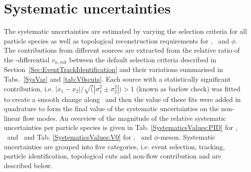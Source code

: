 \section{Systematic uncertainties}
\label{Sec:Systematics}

The systematic uncertainties are estimated by varying the selection criteria for all particle species as well as topological reconstruction requirements for \Ks, \lambdas~and $\phi$. The contributions from different sources are extracted from the relative ratio of the \pT-differential $v_{n,mk}$ between the default selection criteria described in Section~\ref{Sec:EventTrackIdentification} and their variations summarised in Tabs.~\ref{SysVar} and \ref{tab:V0scuts}. Each source with a statistically significant contribution, i.e. $|x_1 - x_2| / \sqrt(|\sigma_{1}^{2} \pm \sigma_{2}^{2}|)  > 1$ (known as barlow check) was fitted to create a smooth change along \pT~and then the value of these fits were added in quadrature to form the final value of the systematic uncertainties on the non-linear flow modes. An overview of the magnitude of the relative systematic uncertainties per particle species is given in Tab. \ref{SystematicsValues:PID} for \pion, \kaon~and \proton~and Tab. \ref{SystematicsValues:V0} for \Ks, \lambdas~and $\phi$-meson. Systematic uncertainties are grouped into five categories, i.e. event selection, tracking, particle identification, topological cuts and non-flow contribution and are described below.


\begin{table}
\centering
\caption{List of the selection criteria and the corresponding variations used for the estimation of the systematic uncertainties of \pion, \kaon~and \proton}\label{SysVar}
\end{table}

